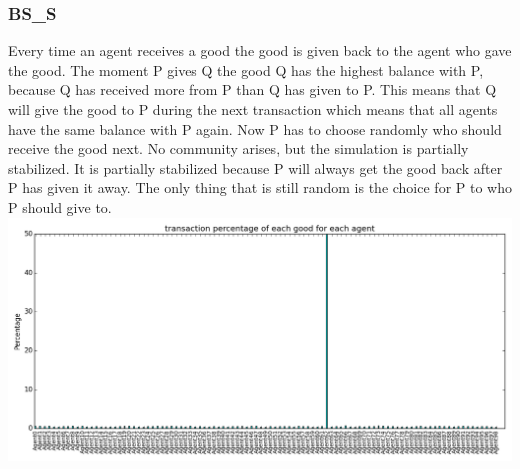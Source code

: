 \documentclass[twoside,openright]{uva-bachelor-thesis}
\begin{document}
\subsubsection{BS\_S}
Every time an agent receives a good the good is given back to the agent who gave the good. The moment P gives Q the good Q has the highest balance with P, because Q has received more from P than Q has given to P. This means that Q will give the good to P during the next transaction which means that all agents have the same balance with P again. Now P has to choose randomly who should receive the good next. No community arises, but the simulation is partially stabilized. It is partially stabilized because P will always get the good back after P has given it away. The only thing that is still random is the choice for P to who P should give to. \\
\includegraphics[scale=0.4]{experiment_images/BR_BS_S}
\end{document}
